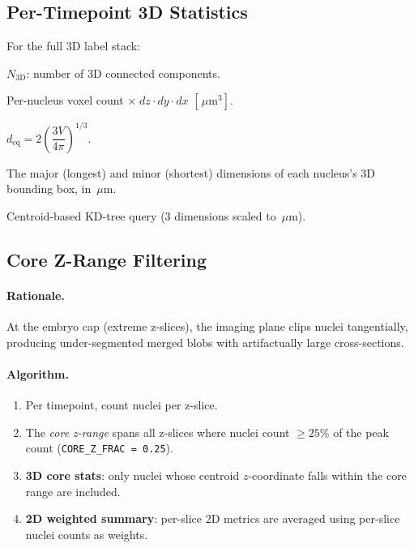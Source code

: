 \documentclass[11pt,a4paper]{article}
\newcommand{\um}{\,\mu\text{m}}
\begin{document}
\subsection*{Per-Timepoint 3D Statistics}

For the full 3D label stack:

\begin{description}[style=nextline,leftmargin=2cm]
  \item[Nuclear count] $N_\mathrm{3D}$: number of 3D connected components.
  \item[Volume] Per-nucleus voxel count $\times\; dz \cdot dy \cdot dx$
    \;$[\um^3]$.
  \item[Equivalent-sphere diameter]
    $d_\mathrm{eq} = 2\left(\dfrac{3V}{4\pi}\right)^{1/3}$.
  \item[Bounding-box extents] The major (longest) and minor (shortest)
    dimensions of each nucleus's 3D bounding box, in $\um$.
  \item[3D NN distance] Centroid-based KD-tree query (3 dimensions scaled
    to $\um$).
\end{description}

\subsection*{Core Z-Range Filtering}
\label{sec:core_z}

\paragraph{Rationale.}  At the embryo cap (extreme z-slices), the imaging
plane clips nuclei tangentially, producing under-segmented merged blobs with
artifactually large cross-sections.

\paragraph{Algorithm.}
\begin{enumerate}[nosep]
  \item Per timepoint, count nuclei per z-slice.
  \item The \emph{core z-range} spans all z-slices where nuclei count
    $\ge 25\%$ of the peak count (\texttt{CORE\_Z\_FRAC = 0.25}).
  \item \textbf{3D core stats}: only nuclei whose centroid $z$-coordinate
    falls within the core range are included.
  \item \textbf{2D weighted summary}: per-slice 2D metrics are averaged
    using per-slice nuclei counts as weights.
\end{enumerate}
\end{document}
